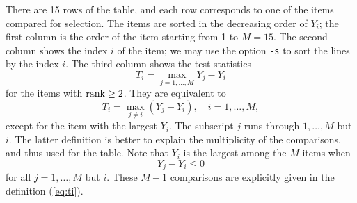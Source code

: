 \documentclass[12pt]{article}
\newcommand{\refeq}[1]{(\ref{eq:#1})}
\begin{document}
There are 15 rows of the table, and each row corresponds to one of the
items compared for selection. The items are sorted in the decreasing
order of $Y_i$; the first column is the order of the item starting from
1 to $M=15$.  The second column shows the index $i$ of the item; we may
use the option {\tt -s} to sort the lines by the index $i$.  The third
column shows the test statistics \[ T_i = \max_{j=1,\ldots,M} Y_j - Y_i
\] for the items with ${\rm rank} \ge 2$. They are equivalent to
\begin{equation}
 T_i = \max_{j\neq i} (Y_j - Y_i), \quad i=1,\ldots,M, \label{eq:ti}
\end{equation}
except for the item with the largest $Y_i$. The subscript $j$ runs
through $1,\ldots,M$ but $i$. The latter definition is better to explain
the multiplicity of the comparisons, and thus used for the table. Note
that $Y_i$ is the largest among the $M$ items when \[ Y_j - Y_i \le 0 \]
for all $j=1,\ldots,M$ but $i$. These $M-1$ comparisons are explicitly
given in the definition \refeq{ti}.
\end{document}
